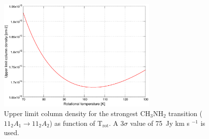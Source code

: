 \begin{figure}[htbp]
  \centering
  \includegraphics[width=0.7\textwidth]{LMSFR/L483.eps}
  \caption{Upper limit column density for the strongest CH$_{3}$NH$_{2}$ transition
  ($11_{2}A_{1} \rightarrow 11_{2}A_{2}$) as function of T$_{\textrm{rot}}$. A 3$\sigma$ value of 
  75\ Jy km s $^{-1}$ is used.}
  \label{L483_MA}
\end{figure}

